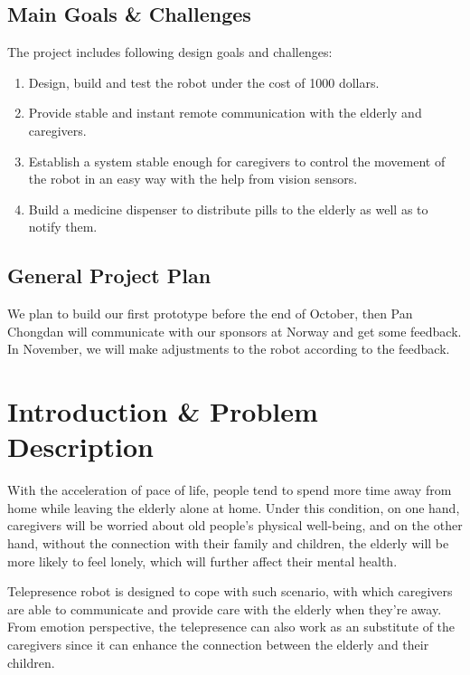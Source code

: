 \documentclass[12pt]{article}
\begin{document}
\subsection{Main Goals \& Challenges} 
\par The project includes following design goals and challenges:
\begin{enumerate}[-]
\item Design, build and test the robot under the cost of 1000 dollars.
\item Provide stable and instant remote communication with the elderly and caregivers. 
\item Establish a system stable enough for caregivers to control the movement of the robot in an easy way with the help from vision sensors.
\item Build a medicine dispenser to distribute pills to the elderly as well as to notify them.
\end{enumerate}
\subsection{General Project Plan}
We plan to build our first prototype before the end of October, then Pan Chongdan will communicate with our sponsors at Norway and get some feedback. In November, we will make adjustments to the robot according to the feedback.
\section{Introduction \& Problem Description }
With the acceleration of pace of life, people tend to spend more time away from home while leaving the elderly alone at home. Under this condition, on one hand, caregivers will be worried about old people's physical well-being, and on the other hand, without the connection with their family and children, the elderly will be more likely to feel lonely, which will further affect their mental health.\par
Telepresence robot is designed to cope with such scenario, with which caregivers are able to communicate and provide care with the elderly when they're away. From emotion perspective, the telepresence can also work as an substitute of the caregivers since it can enhance the connection between the elderly and their children.
\end{document}
